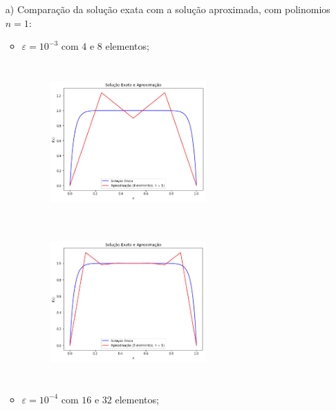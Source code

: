 \documentclass{article}
\begin{document}
\begin{itemize}
\item [a)] Comparação da solução exata com a solução aproximada, com polinomios $n=1$:
\begin{itemize}
\item $\varepsilon = 10^{-3}$ com $4$ e $8$ elementos;

\begin{figure}[!htb]
\centering
\includegraphics[width=6cm,height=6cm]{LetraA/4el_n1_e10-3.png}
\includegraphics[width=6cm,height=6cm]{LetraA/8el_n1_e10-3.png}
\end{figure}

\item $\varepsilon = 10^{-4}$ com $16$ e $32$ elementos;


\end{itemize}
\end{itemize}
\end{document}
